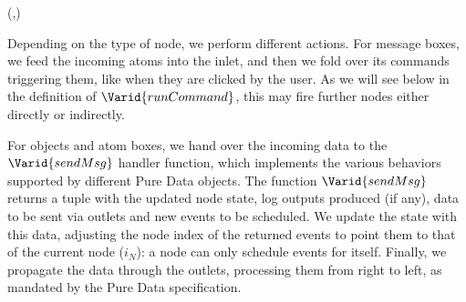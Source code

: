 \begin{hscode}\SaveRestoreHook
{}%
%
\>[B]{}\mathbin{::}\to {}\to (,)\to {}\to {}\<[E]%
\ColumnHook
\end{hscode}\resethooks

Depending on the type of node, we perform different actions. For message
boxes, we feed the incoming atoms into the inlet, and then we fold over its
commands triggering them, like when they are clicked by the user. As we will
see below in the definition of \ensuremath{\Varid{runCommand}}, this may fire further nodes
either directly or indirectly.

\resethooks

For objects and atom boxes, we hand over the incoming data to the
\ensuremath{\Varid{sendMsg}} handler function, which implements the various behaviors
supported by different Pure Data objects. The function \ensuremath{\Varid{sendMsg}}
returns a tuple with the updated node state, log outputs produced (if any),
data to be sent via outlets and new events to be scheduled. We update the
state with this data, adjusting the node index of the returned events to point
them to that of the current node (\ensuremath{i_{N}}): a node can only schedule events for
itself. Finally, we propagate the data through the outlets, processing them
from right to left, as mandated by the Pure Data specification.

